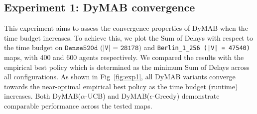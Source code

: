 \documentclass[review]{jair}
\begin{document}
\subsection{Experiment 1: DyMAB convergence}
This experiment aims to assess the convergence properties of $\text{DyMAB}$ when the time budget increases. To achieve this, we plot the Sum of Delays with respect to the time budget on $\texttt{Dense520d (|V| = 28178)}$ and \texttt{Berlin\_1\_256 (|V| = 47540)} maps, with 400 and 600 agents respectively. We compared the results with the empirical best policy which is determined as the minimum Sum of Delays across all configurations. As shown in Fig~\ref{fig:exp1}, all DyMAB variants converge towards the near-optimal empirical best policy as the time budget (runtime) increases. Both DyMAB($\alpha$-UCB) and DyMAB($\epsilon$-Greedy) demonstrate comparable performance across the tested maps.                                                                                                                                                                                                                                                                                                                                                                                                                                                                                                                                                                                                                                                                                                                                                                                                                                                                                                                                                                                                                                                                                                                                                                                                                                                                                                                                                                                                                                                                                                                                                                                                                                                                                                                                                                                                                                                                                                                                                                                                                                                                                                                                                                                                                                                                                                                                                                                                                                                                                  
\end{document}
